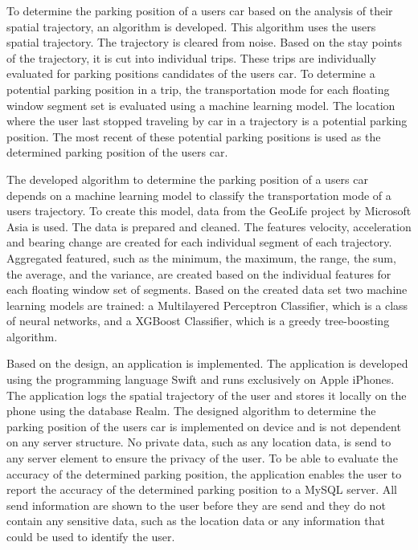 To determine the parking position of a users car based on the analysis of their spatial trajectory, an algorithm is developed. This algorithm uses the users spatial trajectory. The trajectory is cleared from noise. Based on the stay points of the trajectory, it is cut into individual trips. These trips are individually evaluated for parking positions candidates of the users car. To determine a potential parking position in a trip, the transportation mode for each floating window segment set is evaluated using a machine learning model. The location where the user last stopped traveling by car in a trajectory is a potential parking position. The most recent of these potential parking positions is used as the determined parking position of the users car. 

The developed algorithm to determine the parking position of a users car depends on a machine learning model to classify the transportation mode of a users trajectory. To create this model, data from the GeoLife project by Microsoft Asia is used. The data is prepared and cleaned. The features velocity, acceleration and bearing change are created for each individual segment of each trajectory. Aggregated featured, such as the minimum, the maximum, the range, the sum, the average, and the variance, are created based on the individual features for each floating window set of segments. Based on the created data set two machine learning models are trained: a Multilayered Perceptron Classifier, which is a class of neural networks, and a XGBoost Classifier, which is a greedy tree-boosting algorithm. 

Based on the design, an application is implemented. The application is developed using the programming language Swift and runs exclusively on Apple iPhones. The application logs the spatial trajectory of the user and stores it locally on the phone using the database Realm. The designed algorithm to determine the parking position of the users car is implemented on device and is not dependent on any server structure. No private data, such as any location data, is send to any server element to ensure the privacy of the user. To be able to evaluate the accuracy of the determined parking position, the application enables the user to report the accuracy of the determined parking position to a MySQL server. All send information are shown to the user before they are send and they do not contain any sensitive data, such as the location data or any information that could be used to identify the user. 

